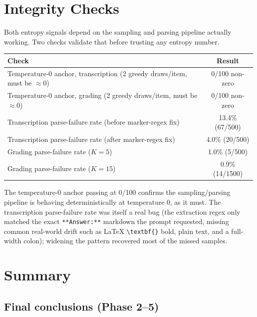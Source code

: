 \documentclass[11pt]{article}
\begin{document}
\section{Integrity Checks}

Both entropy signals depend on the sampling and parsing pipeline actually
working. Two checks validate that before trusting any entropy number.

\begin{center}
\begin{tabular}{lc}
\toprule
Check & Result \\
\midrule
Temperature-0 anchor, transcription (2 greedy draws/item, must be $\approx 0$) & 0/100 non-zero \\
Temperature-0 anchor, grading (2 greedy draws/item, must be $\approx 0$) & 0/100 non-zero \\
Transcription parse-failure rate (before marker-regex fix) & 13.4\% (67/500) \\
Transcription parse-failure rate (after marker-regex fix) & 4.0\% (20/500) \\
Grading parse-failure rate ($K=5$) & 1.0\% (5/500) \\
Grading parse-failure rate ($K=15$) & 0.9\% (14/1500) \\
\bottomrule
\end{tabular}
\end{center}

The temperature-0 anchor passing at 0/100 confirms the sampling/parsing
pipeline is behaving deterministically at temperature 0, as it must. The
transcription parse-failure rate was itself a real bug (the extraction regex
only matched the exact \verb|**Answer:**| markdown the prompt requested, missing
common real-world drift such as \LaTeX{} \verb|\textbf{}| bold, plain text, and
a full-width colon); widening the pattern recovered most of the missed samples.

\section{Summary}

\subsection{Final conclusions (Phase 2--5)}
\end{document}
